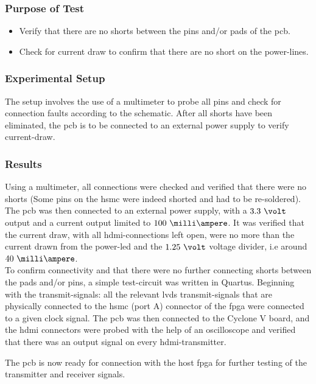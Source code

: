 \documentclass[main.tex]{subfiles}
\begin{document}
\subsubsection{Purpose of Test}

\begin{itemize}\setlength{\itemsep}{10pt}
\item Verify that there are no shorts between the pins and/or pads of the \gls{pcb}. 
\item Check for current draw to confirm that there are no short on the power-lines.
\end{itemize}

\subsubsection{Experimental Setup}

The setup involves the use of a multimeter to probe all pins and check for connection faults according to the schematic. After all shorts have been eliminated, the \gls{pcb} is to be connected to an external power supply to verify current-draw. 

\subsubsection{Results}
 Using a multimeter, all connections were checked and verified that there were no shorts (Some pins on the \gls{hsmc} were indeed shorted and had to be re-soldered). The \gls{pcb} was then connected to an external power supply, with a $3.3~\volt$ output and a current output limited to $100~\milli\ampere$. It was verified that the current draw, with all \gls{hdmi}-connections left open, were no more than the current drawn from the power-\acrshort{led} and the $1.25~\volt$ voltage divider, i.e around $40~\milli\ampere$. \\

To confirm connectivity and that there were no further connecting shorts between the pads and/or pins, a simple test-circuit was written in Quartus. Beginning with the transmit-signals: all the relevant \gls{lvds} transmit-signals that are physically connected to the \gls{hsmc} (port A) connector of the \gls{fpga} were connected to a given clock signal. The \gls{pcb} was then connected to the Cyclone V board, and the \gls{hdmi} connectors were probed with the help of an oscilloscope and verified that there was an output signal on every \gls{hdmi}-transmitter. 

The \gls{pcb} is now ready for connection with the host \gls{fpga} for further testing of the transmitter and receiver signals. 
\end{document}
